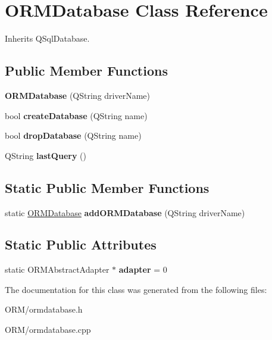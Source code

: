 \hypertarget{class_o_r_m_database}{\section{O\-R\-M\-Database Class Reference}
\label{class_o_r_m_database}
}


Inherits Q\-Sql\-Database.

\subsection*{Public Member Functions}
\begin{DoxyCompactItemize}
\item 
\hypertarget{class_o_r_m_database_a1bfc00123a5d92e1828ebb972f0612b4}{{\bfseries O\-R\-M\-Database} (Q\-String driver\-Name)}\label{class_o_r_m_database_a1bfc00123a5d92e1828ebb972f0612b4}

\item 
\hypertarget{class_o_r_m_database_a9c500c24e76bac9fd8d0e86865318293}{bool {\bfseries create\-Database} (Q\-String name)}\label{class_o_r_m_database_a9c500c24e76bac9fd8d0e86865318293}

\item 
\hypertarget{class_o_r_m_database_affc7579b55a4430de1cac925f02ba1c9}{bool {\bfseries drop\-Database} (Q\-String name)}\label{class_o_r_m_database_affc7579b55a4430de1cac925f02ba1c9}

\item 
\hypertarget{class_o_r_m_database_af3f07807f8da3071587bfe232ed1d34d}{Q\-String {\bfseries last\-Query} ()}\label{class_o_r_m_database_af3f07807f8da3071587bfe232ed1d34d}

\end{DoxyCompactItemize}
\subsection*{Static Public Member Functions}
\begin{DoxyCompactItemize}
\item 
\hypertarget{class_o_r_m_database_ac560b3727f23580cc5c28e70c7460cb4}{static \hyperlink{class_o_r_m_database}{O\-R\-M\-Database} {\bfseries add\-O\-R\-M\-Database} (Q\-String driver\-Name)}\label{class_o_r_m_database_ac560b3727f23580cc5c28e70c7460cb4}

\end{DoxyCompactItemize}
\subsection*{Static Public Attributes}
\begin{DoxyCompactItemize}
\item 
\hypertarget{class_o_r_m_database_a84ddcb13a085bc15c8eeba718574e312}{static O\-R\-M\-Abstract\-Adapter $\ast$ {\bfseries adapter} = 0}\label{class_o_r_m_database_a84ddcb13a085bc15c8eeba718574e312}

\end{DoxyCompactItemize}


The documentation for this class was generated from the following files\-:\begin{DoxyCompactItemize}
\item 
O\-R\-M/ormdatabase.\-h\item 
O\-R\-M/ormdatabase.\-cpp\end{DoxyCompactItemize}
